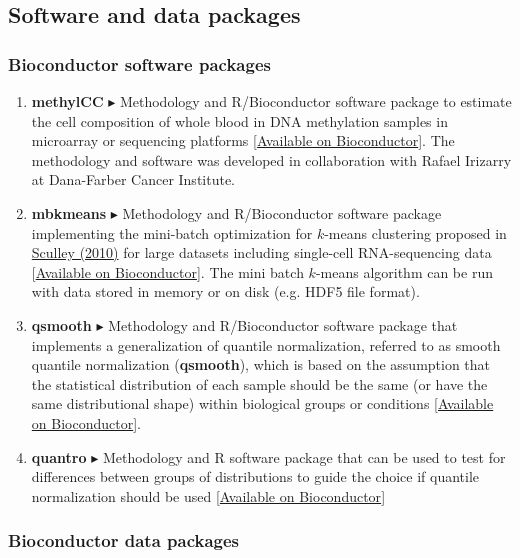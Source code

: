 \documentclass[10pt]{article}
\newcommand{\myben}[1]{\smallskip\begin{enumerate}[start=1,label={\scriptsize \arabic*$\ $},leftmargin=\parindent]\setlength{\itemsep}{#1}\vspace*{-0.7em}}
\newcommand{\ee}{\end{enumerate}}
\begin{document}
\subsection*{Software and data packages}

\subsubsection*{Bioconductor software packages}

\myben{0.4em}

\item
{\bf methylCC} $\blacktriangleright$
Methodology and R/Bioconductor software package to estimate the cell composition of whole blood in DNA methylation samples in microarray or sequencing platforms [\href{http://bioconductor.org/packages/benchmarkfdrData2019}{Available on Bioconductor}]. The methodology and software was developed in collaboration with Rafael Irizarry at Dana-Farber Cancer Institute.
\item
{\bf mbkmeans} $\blacktriangleright$
Methodology and R/Bioconductor software package implementing the mini-batch optimization for $k$-means clustering proposed in \href{https://www.eecs.tufts.edu/~dsculley/papers/fastkmeans.pdf}{Sculley (2010)} for large datasets including single-cell RNA-sequencing data [\href{http://bioconductor.org/packages/mbkmeans}{Available on Bioconductor}]. The mini batch $k$-means algorithm can be run with data stored in memory or on disk (e.g. HDF5 file format).
\item 
{\bf qsmooth} $\blacktriangleright$
Methodology and R/Bioconductor software package that implements a generalization of quantile normalization, referred to as smooth quantile normalization (\textbf{qsmooth}), which is based on the assumption that the statistical distribution of each sample should be the same (or have the same distributional shape) within biological groups or conditions [\href{http://bioconductor.org/packages/qsmooth}{Available on Bioconductor}]. 
\item
{\bf quantro} $\blacktriangleright$
Methodology and R software package that can be used to test for differences between groups of distributions to guide the choice if quantile normalization should be used [\href{http://www.bioconductor.org/packages/quantro}{Available on Bioconductor}]

\ee

\subsubsection*{Bioconductor data packages}
\end{document}
